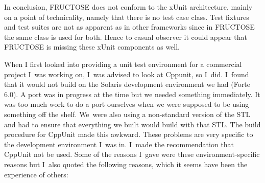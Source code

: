 \documentclass{book}
\begin{document}
In conclusion, FRUCTOSE does not conform to the xUnit architecture, mainly
on a point of technicality, namely that there is no test case class.
Test fixtures and test suites are not as apparent as in other frameworks
since in FRUCTOSE the same class is used for both. Hence to casual observer
it could appear that FRUCTOSE is missing these xUnit components as well.



When I first looked into providing a unit test environment
for a commercial project I~was working on, I~was advised
to look at Cppunit, so I~did.
I~found that it would not build on the Solaris development
environment we had (Forte 6.0). A port was in progress at
the time but we needed something immediately.
It was too much work to do a port ourselves when we were
supposed to be using something off the shelf.
We~were also using a non-standard version of the STL
and had to ensure that everything we built would build with
that STL. The build procedure for CppUnit made this awkward.
These problems are very specific to the development environment
I~was in. I~made the recommendation that CppUnit not be used.
Some of the reasons I~gave were these environment-specific reasons
but I~also quoted the following reasons, which it seems have been
the experience of others:
\end{document}
